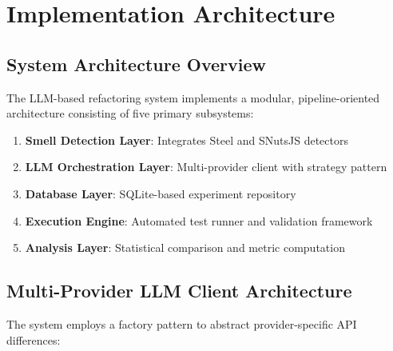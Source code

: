 
\section{Implementation Architecture}
\label{sec:implementation}

\subsection{System Architecture Overview}

The LLM-based refactoring system implements a modular, pipeline-oriented architecture consisting of five primary subsystems:

\begin{enumerate}
    \item \textbf{Smell Detection Layer}: Integrates Steel and SNutsJS detectors
    \item \textbf{LLM Orchestration Layer}: Multi-provider client with strategy pattern
    \item \textbf{Database Layer}: SQLite-based experiment repository
    \item \textbf{Execution Engine}: Automated test runner and validation framework
    \item \textbf{Analysis Layer}: Statistical comparison and metric computation
\end{enumerate}

\subsection{Multi-Provider LLM Client Architecture}

The system employs a factory pattern to abstract provider-specific API differences:

